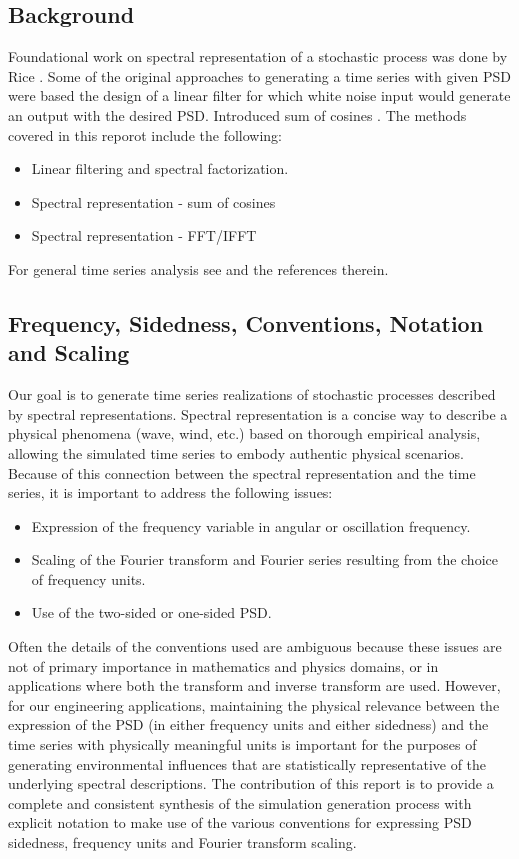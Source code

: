 \documentclass[techreport, article]{npsreport2018}
\begin{document}
\subsection{Background}
Foundational work on spectral representation of a stochastic process was done by 
 Rice \cite{rice44mathematical1,rice45mathematical2}.  Some of the original approaches to generating a time series with given PSD were based the design of a linear filter for which white noise input would generate an output with the desired PSD.  Introduced sum of cosines \cite{borgman69ocean, shinozuka72monte}.  The methods covered in this reporot include the following:
\begin{itemize}
\item Linear filtering and spectral factorization.
\item Spectral representation - sum of cosines
\item Spectral representation - FFT/IFFT
\end{itemize}
\noindent
For general time series analysis see \cite{marchal15notes} and the references therein.

\subsection{Frequency, Sidedness, Conventions, Notation and Scaling}

Our goal is to generate time series realizations of stochastic processes described by spectral representations.  Spectral representation is a concise way to describe a physical phenomena (wave, wind, etc.) based on thorough empirical analysis, allowing the simulated time series to embody authentic physical scenarios.  Because of this connection between the spectral representation and the time series, it is important to address the following issues:
\begin{itemize}
\item Expression of the frequency variable in angular or oscillation frequency.
\item Scaling of the Fourier transform and Fourier series resulting from the choice of frequency units.
\item Use of the two-sided or one-sided PSD.
\end{itemize}
Often the details of the conventions used are ambiguous because these issues are not of primary importance in mathematics and physics domains, or in applications where both the transform and inverse transform are used.  However, for our engineering applications, maintaining the physical relevance between the expression of the PSD (in either frequency units and either sidedness) and the time series with physically meaningful units is important for the purposes of generating environmental influences that are statistically representative of the underlying spectral descriptions.  The contribution of this report is to provide a complete and consistent synthesis of the simulation generation process with explicit notation to make use of the various conventions for expressing PSD sidedness, frequency units and Fourier transform scaling.
\end{document}
